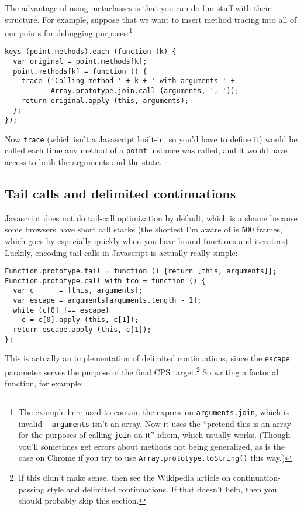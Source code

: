 \documentclass{article}
\begin{document}
    The advantage of using metaclasses is that you can do fun stuff with their structure. For example, suppose that we want to insert method tracing into all of our points for debugging
    purposes:\footnote{The example here used to contain the expression {\tt arguments.join}, which is invalid -- {\tt arguments} isn't an array. Now it uses the ``pretend this is an array for
    the purposes of calling {\tt join} on it'' idiom, which usually works. (Though you'll sometimes get errors about methods not being generalized, as is the case on Chrome if you try to use
    {\tt Array.prototype.toString()} this way.)}

\begin{verbatim}
keys (point.methods).each (function (k) {
  var original = point.methods[k];
  point.methods[k] = function () {
    trace ('Calling method ' + k + ' with arguments ' +
           Array.prototype.join.call (arguments, ', '));
    return original.apply (this, arguments);
  };
});
\end{verbatim}

    Now \verb|trace| (which isn't a Javascript built-in, so you'd have to define it) would be called each time any method of a \verb|point| instance was called, and it would have access to
    both the arguments and the state.

\subsection {Tail calls and delimited continuations}
    Javascript does not do tail-call optimization by default, which is a shame because some browsers have short call stacks (the shortest I'm aware of is 500 frames, which goes by especially
    quickly when you have bound functions and iterators). Luckily, encoding tail calls in Javascript is actually really simple:

\begin{verbatim}
Function.prototype.tail = function () {return [this, arguments]};
Function.prototype.call_with_tco = function () {
  var c      = [this, arguments];
  var escape = arguments[arguments.length - 1];
  while (c[0] !== escape)
    c = c[0].apply (this, c[1]);
  return escape.apply (this, c[1]);
};
\end{verbatim}

    This is actually an implementation of delimited continuations, since the \verb|escape| parameter serves the purpose of the final CPS target.\footnote{If this didn't make sense, then see
    the Wikipedia article on continuation-passing style and delimited continuations. If that doesn't help, then you should probably skip this section.} So writing a factorial function, for
    example:
\end{document}
